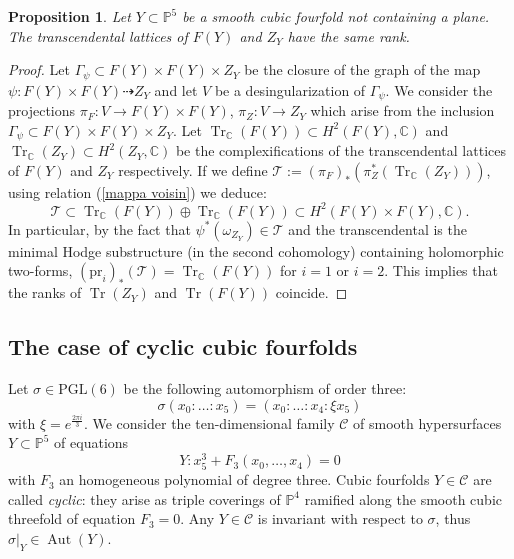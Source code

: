 \documentclass{amsart}
\newtheorem{prop}[theorem]{Proposition}
\theoremstyle{definition}
\newcommand{\ra}{\rightarrow}
\newcommand{\coloneqq}{:=}
\DeclareMathOperator{\aut}{Aut}
\DeclareMathOperator{\trans}{Tr}
\begin{document}
\begin{prop}\label{prop: transcendental llsvs}
Let $Y \subset \mathbb{P}^5$ be a smooth cubic fourfold not containing a plane. The transcendental lattices of $F(Y)$ and $Z_Y$ have the same rank.
\end{prop}

\begin{proof}
Let $\Gamma_{\psi} \subset F(Y) \times F(Y) \times Z_Y$ be the closure of the graph of the map $\psi: F(Y) \times F(Y) \dashrightarrow Z_Y$ and let $V$ be a desingularization of $\Gamma_\psi$. We consider the projections $\pi_F: V \ra F(Y) \times F(Y)$, $\pi_Z: V \ra Z_Y$ which arise from the inclusion $\Gamma_\psi \subset F(Y) \times F(Y) \times Z_Y$. Let $\trans_{\mathbb{C}}(F(Y)) \subset H^2(F(Y), \mathbb{C})$ and $\trans_{\mathbb{C}}(Z_Y) \subset H^2(Z_Y, \mathbb{C})$ be the complexifications of the transcendental lattices of $F(Y)$ and $Z_Y$ respectively. If we define $\mathcal{T} \coloneqq (\pi_F)_*\left( \pi_Z^* \left( \trans_{\mathbb{C}}(Z_Y) \right)\right)$, using relation (\ref{mappa voisin}) we deduce:
$$\mathcal{T} \subset \trans_{\mathbb{C}}(F(Y)) \oplus \trans_{\mathbb{C}}(F(Y)) \subset H^2(F(Y) \times F(Y), \mathbb{C}).$$
In particular, by the fact that $\psi^*(\omega_{Z_Y}) \in \mathcal{T}$ and the transcendental is the minimal Hodge substructure (in the second cohomology) containing holomorphic two-forms, $(\textrm{pr}_i)_*(\mathcal{T}) = \trans_{\mathbb{C}}(F(Y))$ for $i=1$ or $i=2$. This implies that the ranks of $\trans(Z_Y)$ and $\trans(F(Y))$ coincide. 
\end{proof}

\subsection{The case of cyclic cubic fourfolds} \label{subsection: eightfolds cyclic}
Let $\sigma \in \textrm{PGL}(6)$ be the following automorphism of order three:
\begin{equation} \label{eq: automorphism on cyclic cubics}
\sigma(x_0 : \ldots : x_5) = (x_0 : \ldots : x_4 : \xi x_5)
\end{equation}
\noindent with $\xi = e^{\frac{2 \pi i}{3}}$. We consider the ten-dimensional family $\mathcal{C}$ of smooth hypersurfaces $Y \subset \mathbb{P}^5$ of equations
\begin{equation*}
Y: x_5^3 + F_3(x_0, \ldots, x_4) = 0
\end{equation*} 
\noindent with $F_3$ an homogeneous polynomial of degree three. Cubic fourfolds $Y \in \mathcal{C}$ are called \emph{cyclic}: they arise as triple coverings of $\mathbb{P}^4$ ramified along the smooth cubic threefold of equation $F_3 = 0$. Any $Y \in \mathcal{C}$ is invariant with respect to $\sigma$, thus $\sigma\vert_Y \in \aut(Y)$.
\end{document}
